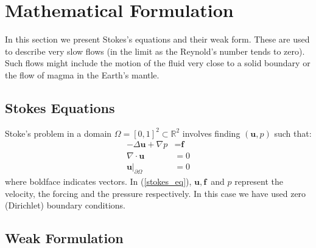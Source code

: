 \documentclass[12pt,a4paper]{article}
\theoremstyle{definition}
\begin{document}
\section{Mathematical Formulation}\label{sec_mathform}
In this section we present Stokes's equations and their weak form.   These are used to describe very slow flows (in the limit as the Reynold's number tends to zero).  Such flows might include the motion of the fluid very close to a solid boundary or the flow of magma in the Earth's mantle.  
\subsection{Stokes Equations}
Stoke's problem in a domain $\Omega = \left[0,1\right]^2 \subset \mathbb{R}^2$ involves finding $\left(\textbf{u},p\right)$ such that:
\begin{equation}\label{stokes_eq}
\begin{aligned}
	-\Delta\textbf{u} + \nabla p &= \textbf{f} \\ 
	\nabla\cdot \textbf{u}&= 0\\ 
\textbf{u}|_{\partial\Omega}&=0 
\end{aligned}
\end{equation}
where boldface indicates vectors.  In (\ref{stokes_eq}), $\textbf{u},\, \textbf{f}$ and $p$ represent the velocity, the forcing and the pressure respectively.  In this case we have used zero (Dirichlet) boundary conditions. 
\subsection{Weak Formulation}\label{weak-form-stokes}
\end{document}
